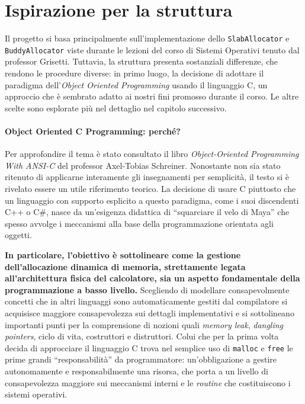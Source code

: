 \section{Ispirazione per la struttura}
Il progetto si basa principalmente sull’implementazione dello \texttt{SlabAllocator} e \texttt{BuddyAllocator} viste durante le lezioni del corso di Sistemi Operativi tenuto dal professor Grisetti. Tuttavia, la struttura presenta sostanziali differenze, che rendono le procedure diverse: in primo luogo, la decisione di adottare il paradigma dell'\textit{Object Oriented Programming} usando il linguaggio C, un approccio che è sembrato adatto ai nostri fini promosso durante il corso. Le altre scelte sono esplorate più nel dettaglio nel capitolo successivo.

\paragraph{Object Oriented C Programming: perché?}

Per approfondire il tema è stato consultato il libro \textit{Object-Oriented Programming With ANSI-C} del professor Axel-Tobias Schreiner\cite{schreiner1994}. Nonostante non sia stato ritenuto di applicarne interamente gli insegnamenti per semplicità, il testo si è rivelato essere un utile riferimento teorico. La decisione di usare C piuttosto che un linguaggio con supporto esplicito a questo paradigma, come i suoi discendenti C++ o C\#, nasce da un’esigenza didattica di ``squarciare il velo di Maya'' che spesso avvolge i meccanismi alla base della programmazione orientata agli oggetti.

\textbf{In particolare, l'obiettivo è sottolineare come la gestione dell’allocazione dinamica di memoria, strettamente legata all’architettura fisica del calcolatore, sia un aspetto fondamentale della programmazione a basso livello.} Scegliendo di modellare consapevolmente concetti che in altri linguaggi sono automaticamente gestiti dal compilatore si acquisisce maggiore consapevolezza sui dettagli implementativi e si sottolineano importanti punti per la comprensione di nozioni quali \textit{memory leak}, \textit{dangling pointers}, ciclo di vita, costruttori e distruttori. Colui che per la prima volta decida di approcciare il linguaggio C trova nel semplice uso di \texttt{malloc} e \texttt{free} le prime grandi ``responsabilità'' da programmatore: un’obbligazione a gestire autonomamente e responsabilmente una risorsa, che porta a un livello di consapevolezza maggiore sui meccanismi interni e le \textit{routine} che costituiscono i sistemi operativi. 

